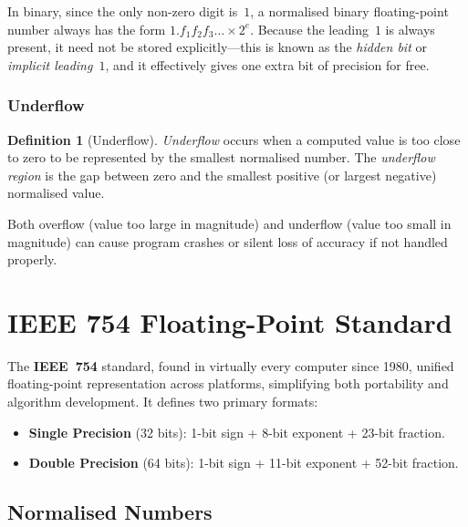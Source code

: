 \documentclass[11pt, a4paper, notitlepage]{report}
\theoremstyle{definition}
\newtheorem{definition}[theorem]{Definition}
\theoremstyle{remark}
\theoremstyle{definition}
\begin{document}
In binary, since the only non-zero digit is~$1$, a normalised binary floating-point number always has the form $1.f_1 f_2 f_3 \ldots \times 2^e$. Because the leading~$1$ is always present, it need not be stored explicitly---this is known as the \emph{hidden bit} or \emph{implicit leading~$1$}, and it effectively gives one extra bit of precision for free.

\subsubsection{Underflow}

\begin{definition}[Underflow]
  \label{def:underflow}
  \emph{Underflow} occurs when a computed value is too close to zero to be represented by the smallest normalised number. The \emph{underflow region} is the gap between zero and the smallest positive (or largest negative) normalised value.
\end{definition}

Both overflow (value too large in magnitude) and underflow (value too small in magnitude) can cause program crashes or silent loss of accuracy if not handled properly.


\section{IEEE 754 Floating-Point Standard}
\label{sec:ieee754}

The \textbf{IEEE~754} standard, found in virtually every computer since 1980, unified floating-point representation across platforms, simplifying both portability and algorithm development. It defines two primary formats:

\begin{itemize}
  \item \textbf{Single Precision} (32 bits): 1-bit sign + 8-bit exponent + 23-bit fraction.
  \item \textbf{Double Precision} (64 bits): 1-bit sign + 11-bit exponent + 52-bit fraction.
\end{itemize}

\subsection{Normalised Numbers}
\label{sec:ieee754-normalised}
\end{document}

